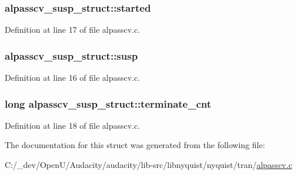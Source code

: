 \subsubsection[{\texorpdfstring{started}{started}}]{ alpasscv\+\_\+susp\+\_\+struct\+::started}\hypertarget{structalpasscv__susp__struct_a018fc198a18caf68843bbd70678a6ff6}{}\label{structalpasscv__susp__struct_a018fc198a18caf68843bbd70678a6ff6}


Definition at line 17 of file alpasscv.\+c.

\subsubsection[{\texorpdfstring{susp}{susp}}]{ alpasscv\+\_\+susp\+\_\+struct\+::susp}\hypertarget{structalpasscv__susp__struct_a4408b38b64b04a62aa0eeb198e3d239a}{}\label{structalpasscv__susp__struct_a4408b38b64b04a62aa0eeb198e3d239a}


Definition at line 16 of file alpasscv.\+c.

\subsubsection[{\texorpdfstring{terminate\+\_\+cnt}{terminate_cnt}}]{\setlength{\rightskip}{0pt plus 5cm}long alpasscv\+\_\+susp\+\_\+struct\+::terminate\+\_\+cnt}\hypertarget{structalpasscv__susp__struct_aa6008314d5b62d2e7ca21affc10ace39}{}\label{structalpasscv__susp__struct_aa6008314d5b62d2e7ca21affc10ace39}


Definition at line 18 of file alpasscv.\+c.



The documentation for this struct was generated from the following file\+:\begin{DoxyCompactItemize}
\item 
C\+:/\+\_\+dev/\+Open\+U/\+Audacity/audacity/lib-\/src/libnyquist/nyquist/tran/\hyperlink{alpasscv_8c}{alpasscv.\+c}\end{DoxyCompactItemize}
